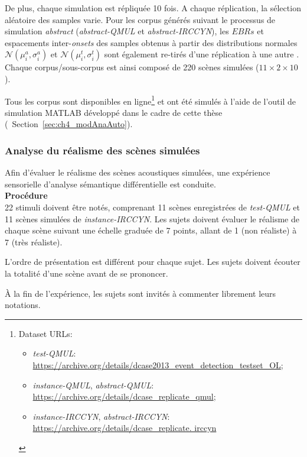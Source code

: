 De plus, chaque simulation est répliquée 10 fois. A chaque réplication, la sélection aléatoire des samples varie. Pour les corpus générés suivant le processus de simulation \emph{abstract} (\emph{abstract-QMUL} et \emph{abstract-IRCCYN}), les $EBRs$ et espacements inter-\emph{onsets} des samples obtenus à partir des distributions normales  $\mathcal{N}(\mu_i^a,\sigma_i^a)$ et $\mathcal{N}(\mu_i^t,\sigma_i^t)$ sont également re-tirés d'une réplication à une autre . Chaque corpus/sous-corpus est ainsi composé de 220 scènes simulées ($11\times2\times10$).

Tous les corpus sont disponibles en ligne\footnote{Dataset URLs: \begin{itemize}
\item \emph{test-QMUL}: \url{https://archive.org/details/dcase2013_event_detection_testset_OL};
\item \emph{instance-QMUL}, \emph{abstract-QMUL}: \url{https://archive.org/details/dcase_replicate_qmul};
\item \emph{instance-IRCCYN}, \emph{abstract-IRCCYN}: \url{https://archive.org/details/dcase_replicate.
irccyn}
\end{itemize}} et ont été simulés à l'aide de l'outil de simulation MATLAB développé dans le cadre de cette thèse (\cf~Section~\ref{sec:ch4_modAnaAuto}).

\subsubsection{Analyse du réalisme des scènes simulées}

Afin d'évaluer le réalisme des scènes acoustiques simulées, une expérience sensorielle d'analyse sémantique différentielle est conduite. \\

\textbf{Procédure} \\

22 stimuli doivent être notés, comprenant 11 scènes enregistrées de \emph{test-QMUL} et 11 scènes simulées de \emph{instance-IRCCYN}. Les sujets doivent évaluer le réalisme de chaque scène suivant une échelle graduée de 7 points, allant de 1 (non réaliste) à 7 (très réaliste). 

L'ordre de présentation est différent pour chaque sujet. Les sujets doivent écouter la totalité d'une scène avant de se prononcer.

À la fin de l'expérience, les sujets sont invités à commenter librement leurs notations. \\

